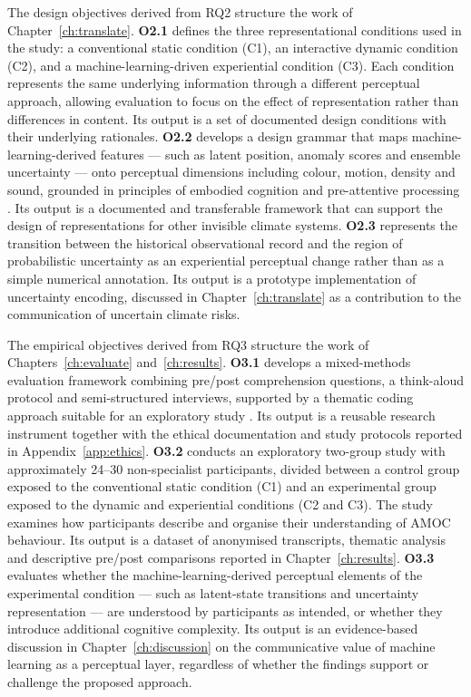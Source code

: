 The design objectives derived from RQ2 structure the work of Chapter~\ref{ch:translate}. \textbf{O2.1} defines the three representational conditions used in the study: a conventional static condition (C1), an interactive dynamic condition (C2), and a machine-learning-driven experiential condition (C3). Each condition represents the same underlying information through a different perceptual approach, allowing evaluation to focus on the effect of representation rather than differences in content. Its output is a set of documented design conditions with their underlying rationales. \textbf{O2.2} develops a design grammar that maps machine-learning-derived features --- such as latent position, anomaly scores and ensemble uncertainty --- onto perceptual dimensions including colour, motion, density and sound, grounded in principles of embodied cognition and pre-attentive processing \citep{ware2021, hermann2011}. Its output is a documented and transferable framework that can support the design of representations for other invisible climate systems. \textbf{O2.3} represents the transition between the historical observational record and the region of probabilistic uncertainty as an experiential perceptual change rather than as a simple numerical annotation. Its output is a prototype implementation of uncertainty encoding, discussed in Chapter~\ref{ch:translate} as a contribution to the communication of uncertain climate risks.

The empirical objectives derived from RQ3 structure the work of Chapters~\ref{ch:evaluate} and~\ref{ch:results}. \textbf{O3.1} develops a mixed-methods evaluation framework combining pre/post comprehension questions, a think-aloud protocol and semi-structured interviews, supported by a thematic coding approach suitable for an exploratory study \citep{braunclarke2006}. Its output is a reusable research instrument together with the ethical documentation and study protocols reported in Appendix~\ref{app:ethics}. \textbf{O3.2} conducts an exploratory two-group study with approximately 24--30 non-specialist participants, divided between a control group exposed to the conventional static condition (C1) and an experimental group exposed to the dynamic and experiential conditions (C2 and C3). The study examines how participants describe and organise their understanding of AMOC behaviour. Its output is a dataset of anonymised transcripts, thematic analysis and descriptive pre/post comparisons reported in Chapter~\ref{ch:results}. \textbf{O3.3} evaluates whether the machine-learning-derived perceptual elements of the experimental condition --- such as latent-state transitions and uncertainty representation --- are understood by participants as intended, or whether they introduce additional cognitive complexity. Its output is an evidence-based discussion in Chapter~\ref{ch:discussion} on the communicative value of machine learning as a perceptual layer, regardless of whether the findings support or challenge the proposed approach.

